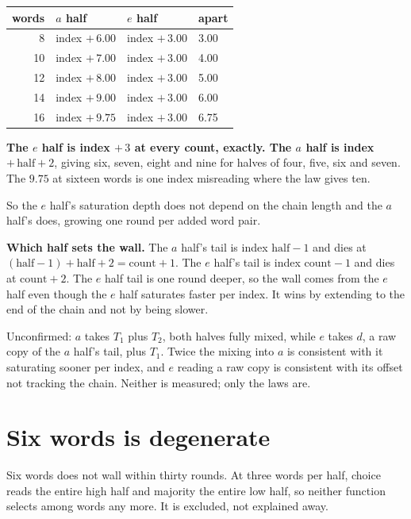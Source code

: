 \begin{center}
\begin{tabular}{rlll}
\toprule
words & \(a\) half & \(e\) half & apart \\
\midrule
8 & index \(+\, 6.00\) & index \(+\, 3.00\) & 3.00 \\
10 & index \(+\, 7.00\) & index \(+\, 3.00\) & 4.00 \\
12 & index \(+\, 8.00\) & index \(+\, 3.00\) & 5.00 \\
14 & index \(+\, 9.00\) & index \(+\, 3.00\) & 6.00 \\
16 & index \(+\, 9.75\) & index \(+\, 3.00\) & 6.75 \\
\bottomrule
\end{tabular}
\end{center}

\textbf{The \(e\) half is index \(+\,3\) at every count, exactly. The \(a\) half is index \(+\, \mathrm{half} + 2\)}, giving six, seven, eight and nine for halves of four, five, six and seven. The \(9.75\) at sixteen words is one index misreading where the law gives ten.

So the \(e\) half's saturation depth does not depend on the chain length and the \(a\) half's does, growing one round per added word pair.

\textbf{Which half sets the wall.} The \(a\) half's tail is index \(\mathrm{half}-1\) and dies at \((\mathrm{half}-1) + \mathrm{half} + 2 = \mathrm{count} + 1\). The \(e\) half's tail is index \(\mathrm{count}-1\) and dies at \(\mathrm{count} + 2\). The \(e\) half tail is one round deeper, so the wall comes from the \(e\) half even though the \(e\) half saturates faster per index. It wins by extending to the end of the chain and not by being slower.

Unconfirmed: \(a\) takes \(T_1\) plus \(T_2\), both halves fully mixed, while \(e\) takes \(d\), a raw copy of the \(a\) half's tail, plus \(T_1\). Twice the mixing into \(a\) is consistent with it saturating sooner per index, and \(e\) reading a raw copy is consistent with its offset not tracking the chain. Neither is measured; only the laws are.

\section{Six words is degenerate}

Six words does not wall within thirty rounds. At three words per half, choice reads the entire high half and majority the entire low half, so neither function selects among words any more. It is excluded, not explained away.
